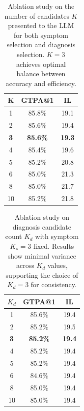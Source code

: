 \begin{table}[t]
\centering
\caption{Ablation study on the number of candidates $K$ presented to the LLM for both symptom selection and diagnosis selection. $K=3$ achieves optimal balance between accuracy and efficiency.}
\label{tab:topk_joint}
\begin{tabular}{ccc}
\toprule
\textbf{K} & \textbf{GTPA@1} & \textbf{IL} \\
\midrule
1 & 85.8\% & 19.1 \\
2 & 85.6\% & 19.4 \\
\textbf{3} & \textbf{85.6\%} & \textbf{19.3} \\
4 & 85.4\% & 19.6 \\
5 & 85.2\% & 20.8 \\
6 & 85.0\% & 21.3 \\
8 & 85.0\% & 21.7 \\
10 & 85.2\% & 21.8 \\
\bottomrule
\end{tabular}
\end{table}

\begin{table}[t]
\centering
\caption{Ablation study on diagnosis candidate count $K_d$ with symptom $K_s=3$ fixed. Results show minimal variance across $K_d$ values, supporting the choice of $K_d=3$ for consistency.}
\label{tab:topk_diagnosis}
\begin{tabular}{ccc}
\toprule
\textbf{$K_d$} & \textbf{GTPA@1} & \textbf{IL} \\
\midrule
1 & 85.6\% & 19.4 \\
2 & 85.2\% & 19.5 \\
\textbf{3} & \textbf{85.2\%} & \textbf{19.4} \\
4 & 85.2\% & 19.4 \\
5 & 85.2\% & 19.4 \\
6 & 84.6\% & 19.4 \\
8 & 85.0\% & 19.4 \\
10 & 85.0\% & 19.4 \\
\bottomrule
\end{tabular}
\end{table}

